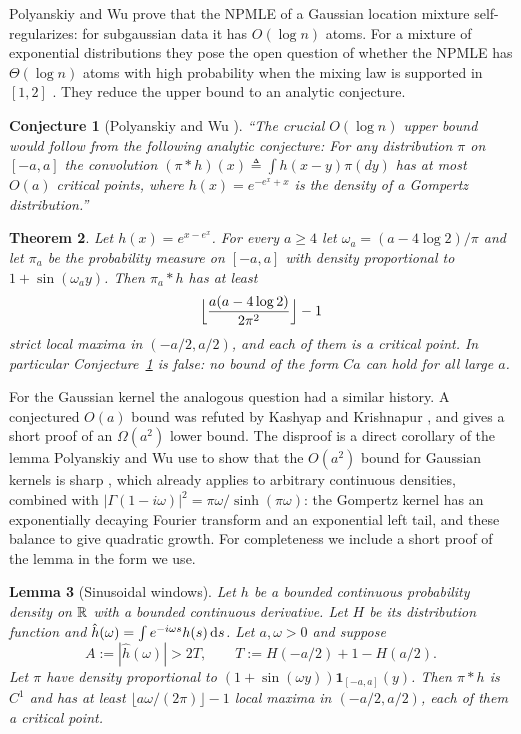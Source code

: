\documentclass[11pt]{amsart}
\newtheorem{theorem}{Theorem}[section]
\newtheorem{lemma}[theorem]{Lemma}
\newtheorem{conjecture}[theorem]{Conjecture}
\theoremstyle{definition}
\theoremstyle{remark}
\begin{document}
Polyanskiy and Wu \cite{R5-PW20} prove that the NPMLE of a Gaussian
location mixture self-regularizes: for subgaussian data it has $O(\log n)$
atoms.  For a mixture of exponential distributions they pose the open
question of whether the NPMLE has $\Theta(\log n)$ atoms with high
probability when the mixing law is supported in $[1,2]$
\cite[Sec.~5.2, eq.~(37)]{R5-PW20}.  They reduce the upper bound to an
analytic conjecture.

\begin{conjecture}[Polyanskiy and Wu {\cite[Sec.~5.2]{R5-PW20}}]
\label{R5:conj:gompertz}
``The crucial $O(\log n)$ upper bound would follow from the following
analytic \emph{conjecture}: For any distribution $\pi$ on $[-a,a]$ the
convolution $(\pi*h)(x)\triangleq\int h(x-y)\pi(dy)$ has at most $O(a)$
critical points, where $h(x)=e^{-e^x+x}$ is the density of a Gompertz
distribution.''
\end{conjecture}

\begin{theorem}\label{R5:thm:gompertz}
Let $h(x)=e^{x-e^x}$.  For every $a\ge4$ let
$\omega_a=(a-4\log2)/\pi$ and let $\pi_a$ be the probability measure on
$[-a,a]$ with density proportional to $1+\sin(\omega_ay)$.  Then $\pi_a*h$
has at least
\[
 \Bigl\lfloor\frac{a(a-4\log2)}{2\pi^2}\Bigr\rfloor-1
\]
strict local maxima in $(-a/2,a/2)$, and each of them is a critical point.
In particular Conjecture~\ref{R5:conj:gompertz} is false: no bound of the
form $Ca$ can hold for all large $a$.
\end{theorem}

For the Gaussian kernel the analogous question had a similar history.  A
conjectured $O(a)$ bound was refuted by Kashyap and Krishnapur \cite{R5-KK20},
and \cite[Sec.~5.4]{R5-PW20} gives a short proof of an $\Omega(a^2)$ lower
bound.  The disproof is a direct corollary of the lemma Polyanskiy and Wu use to
show that the $O(a^2)$ bound for Gaussian kernels is sharp
\cite[Lemma~9]{R5-PW20}, which already applies to arbitrary continuous
densities, combined with $|\Gamma(1-i\omega)|^2=\pi\omega/\sinh(\pi\omega)$: the
Gompertz kernel has an exponentially decaying Fourier transform and an
exponential left tail, and these balance to give quadratic growth.  For
completeness we include a short proof of the lemma in the form we use.

\begin{lemma}[Sinusoidal windows]\label{R5:lem:window}
Let $h$ be a bounded continuous probability density on $\mathbb{R}$ with a bounded
continuous derivative.  Let $H$ be its distribution function and
$\hat h(\omega)=\int e^{-i\omega s}h(s)\,\mathrm{d} s$.  Let $a,\omega>0$ and suppose
\[
 A:=|\hat h(\omega)|>2T,\qquad T:=H(-a/2)+1-H(a/2).
\]
Let $\pi$ have density proportional to $(1+\sin(\omega y))\mathbf 1_{[-a,a]}(y)$.
Then $\pi*h$ is $C^1$ and has at least $\lfloor a\omega/(2\pi)\rfloor-1$ local
maxima in $(-a/2,a/2)$, each of them a critical point.
\end{lemma}
\end{document}
